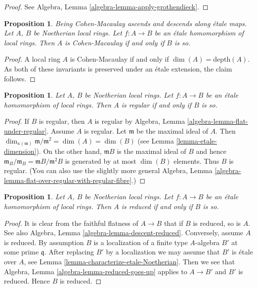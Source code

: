 \documentclass{stacks-project}
\newenvironment{slogan}{\comment}{\endcomment}
\theoremstyle{plain}
\newtheorem{proposition}[subsection]{Proposition}
\theoremstyle{definition}
\theoremstyle{remark}
\numberwithin{equation}{subsection}
\begin{document}
\begin{proof}
See Algebra, Lemma \ref{algebra-lemma-apply-grothendieck}.
\end{proof}

\begin{proposition}
\label{proposition-etale-CM}
\begin{slogan}
Being Cohen-Macaulay ascends and descends along \'etale maps.
\end{slogan}
Let $A$, $B$ be Noetherian local rings.
Let $f : A \to B$ be an \'etale homomorphism of local rings.
Then $A$ is Cohen-Macaulay if and only if $B$ is so.
\end{proposition}

\begin{proof}
A local ring $A$ is Cohen-Macaulay if and only if $\dim(A) = \text{depth}(A)$.
As both of these invariants is preserved under an \'etale extension,
the claim follows.
\end{proof}

\begin{proposition}
\label{proposition-etale-regular}
Let $A$, $B$ be Noetherian local rings.
Let $f : A \to B$ be an \'etale homomorphism of local rings.
Then $A$ is regular if and only if $B$ is so.
\end{proposition}

\begin{proof}
If $B$ is regular, then $A$ is regular by
Algebra, Lemma \ref{algebra-lemma-flat-under-regular}.
Assume $A$ is regular. Let $\mathfrak m$ be the maximal ideal
of $A$. Then $\dim_{\kappa(\mathfrak m)} \mathfrak m/\mathfrak m^2 =
\dim(A) = \dim(B)$ (see Lemma \ref{lemma-etale-dimension}).
On the other hand, $\mathfrak mB$ is the maximal ideal of
$B$ and hence $\mathfrak m_B/\mathfrak m_B = \mathfrak mB/\mathfrak m^2B$
is generated by at most $\dim(B)$ elements. Thus $B$ is regular.
(You can also use the slightly more general
Algebra, Lemma \ref{algebra-lemma-flat-over-regular-with-regular-fibre}.)
\end{proof}


\begin{proposition}
\label{proposition-etale-reduced}
Let $A$, $B$ be Noetherian local rings.
Let $f : A \to B$ be an \'etale homomorphism of local rings.
Then $A$ is reduced if and only if $B$ is so.
\end{proposition}

\begin{proof}
It is clear from the faithful flatness of $A \to B$ that if $B$ is reduced, so
is $A$. See also Algebra, Lemma \ref{algebra-lemma-descent-reduced}.
Conversely, assume $A$ is reduced. By assumption $B$ is a localization
of a finite type $A$-algebra $B'$ at some prime $\mathfrak q$.
After replacing $B'$ by a localization we may assume that $B'$
is \'etale over $A$, see Lemma \ref{lemma-characterize-etale-Noetherian}.
Then we see that Algebra, Lemma \ref{algebra-lemma-reduced-goes-up} applies to
$A \to B'$ and $B'$ is reduced. Hence $B$ is reduced.
\end{proof}
\end{document}
